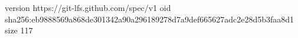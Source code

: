 version https://git-lfs.github.com/spec/v1
oid sha256:eb9888569a868de301342a90a296189278d7a9def665627adc2e28d5b3faa8d1
size 117
